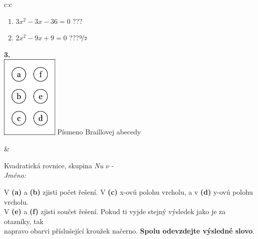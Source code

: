 \documentclass[10pt]{report}
\begin{document}
\begin{tabular}{c:c}
\begin{minipage}[c][104.5mm][t]{0.5\linewidth}
\begin{center}
\begin{minipage}{0.79\linewidth}
\begin{center}
\begin{varwidth}{\linewidth}
\begin{enumerate}
\item $3x^2-3x-36=0$\quad \dotfill\; ???\;\dotfill {}
\item $2x^2-9x+9=0$\quad \dotfill\; ???\;\dotfill \quad $\nicefrac{9}{2}$
\end{enumerate}
\end{varwidth}
\end{center}
\end{minipage}
\begin{minipage}{0.20\linewidth}
\begin{center}
{\Huge\bfseries 3.} \\[2mm]
\includegraphics[height=40mm]{../images/braille.png}
{\small Písmeno Braillovej abecedy}
\end{center}
\end{minipage}
\end{center}
\end{minipage}
&
\begin{minipage}[c][104.5mm][t]{0.5\linewidth}
\begin{center}
\vspace{7mm}
{\huge Kvadratická rovnice, skupina \textit{Nu $\nu$} -}\\[5mm]
\textit{Jméno:}\phantom{xxxxxxxxxxxxxxxxxxxxxxxxxxxxxxxxxxxxxxxxxxxxxxxxxxxxxxxxxxxxxxxxx}\\[5mm]
\begin{minipage}{0.95\linewidth}
\begin{center}
V \textbf{(a)} a \textbf{(b)} zjisti počet řešení. V \textbf{(c)} x-ovú polohu vrcholu, a v \textbf{(d)} y-ovú polohu vrcholu.\\V \textbf{(e)} a \textbf{(f)} zjisti součet řešení. Pokud ti vyjde stejný výsledek jako je za otazníky, tak\\napravo obarvi příslušející kroužek načerno. \textbf{Spolu odevzdejte výsledné slovo}.
\end{center}
\end{minipage}
\\[1mm]
\begin{minipage}{0.79\linewidth}
\begin{center}

\end{center}
\end{minipage}
\end{center}
\end{minipage}
\end{tabular}
\end{document}
